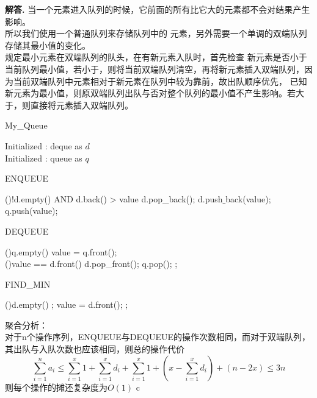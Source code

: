 \documentclass[12pt, a4paper, oneside]{ctexart}
\newenvironment{solution}{\par\noindent\textbf{解答. }}{\par}
\begin{document}
\begin{solution}
    当一个元素进入队列的时候，它前面的所有比它大的元素都不会对结果产生影响。\\所以我们使用一个普通队列来存储队列中的
    元素，另外需要一个单调的双端队列存储其最小值的变化。\\规定最小元素在双端队列的队头，在有新元素入队时，首先检查
    新元素是否小于当前队列最小值，若小于，则将当前双端队列清空，再将新元素插入双端队列，因为当前双端队列中元素相对于新元素在队列中较为靠前，故出队顺序优先，
    已知新元素为最小值，则原双端队列出队与否对整个队列的最小值不产生影响。若大于，则直接将元素插入双端队列。\\
    \begin{algorithm*}
        \caption{My\_Queue}
        \label{alg:algorithm}
        Initialized : deque as $d$\\
        Initialized : queue as $q$
    \end{algorithm*}
    \begin{algorithm*}
        \caption{ENQUEUE}
        \label{alg:algorithm}
        \While(){!d.empty() AND d.back() > value}{
            d.pop\_back();
        }
        d.push$\_$back(value);\\
        q.push(value);
    \end{algorithm*}
    \pagebreak
    \begin{algorithm*}
        \caption{DEQUEUE}
        \label{alg:algorithm}
        \If(){q.empty()}{
        }
        value = q.front();\\
        \If(){value == d.front()}{
            d.pop\_front();
        }
        q.pop();
        \BlankLine
        ;
    \end{algorithm*}
    \begin{algorithm*}
        \caption{FIND\_MIN}
        \label{alg:algorithm}
        \If(){d.empty()}{
            ;
        }
        value = d.front();
        \BlankLine
        ;
    \end{algorithm*}
    \newpage
聚合分析：\\
对于n个操作序列，ENQUEUE与DEQUEUE的操作次数相同，而对于双端队列，其出队与入队次数也应该相同，则总的操作代价
$$\sum_{i=1}^{n}a_{i}\leq \sum_{i=1}^{x}1+\sum_{i=1}^{x}d_{i}+\sum_{i=1}^{x}1+(x-\sum_{i=1}^{x}d_{i})+(n-2x)
\leq 3n$$
则每个操作的摊还复杂度为$O(1)$
c
\end{solution}
\end{document}
